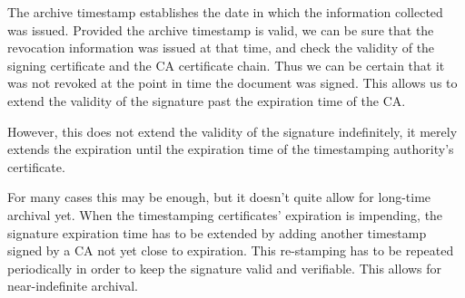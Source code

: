 The archive timestamp establishes the date in which the information collected was issued.
Provided the archive timestamp is valid,
we can be sure that the revocation information was issued at that time,
and check the validity of the signing certificate and the \gls{CA} certificate chain.
Thus we can be certain that it was not revoked at the point in time the document was signed.
This allows us to extend the validity of the signature past the expiration time of the \gls{CA}.

However, this does not extend the validity of the signature indefinitely,
it merely extends the expiration until the expiration time of the timestamping authority's certificate.

For many cases this may be enough, but it doesn't quite allow for long-time archival yet.
When the timestamping certificates' expiration is impending,
the signature expiration time has to be extended by adding another timestamp signed by a \gls{CA} not yet close to expiration.
This re-stamping has to be repeated periodically in order to keep the signature valid and verifiable.
This allows for near-indefinite archival.

